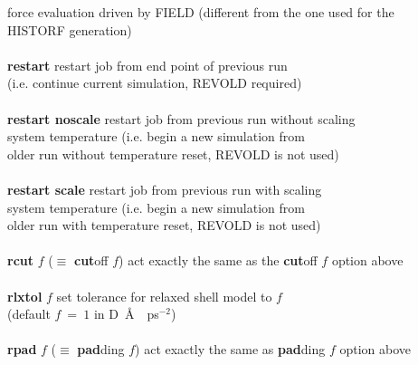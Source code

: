 \begin{tabbing}
\>                                              \> force evaluation driven by FIELD (different from the one used for the \\
\>                                              \> HISTORF generation) \\
\>                                              \> \\
\> {\bf restart}                                \> restart job from end point of previous run \\
\>                                              \> (i.e. continue current simulation, REVOLD required) \\
\>                                              \> \\
\> {\bf restart noscale}                        \> restart job from previous run without scaling \\
\>                                              \> system temperature (i.e. begin a new simulation from \\
\>                                              \> older run without temperature reset, REVOLD is not used) \\
\>                                              \> \\
\> {\bf restart scale}                          \> restart job from previous run with scaling \\
\>                                              \> system temperature (i.e. begin a new simulation from \\
\>                                              \> older run with temperature reset, REVOLD is not used) \\
\>                                              \> \\
\> {\bf rcut} $f$  ($\equiv$ {\bf cut}off $f$)  \> act exactly the same as the {\bf cut}off $f$ option above \\
\>                                              \> \\
\> {\bf rlxtol} $f$                             \> set tolerance for relaxed shell model to $f$ \\
\>                                              \> (default $f~=~1$ in D~\AA~~ps$^{-2}$) \\
\>                                              \> \\
\> {\bf rpad} $f$  ($\equiv$ {\bf pad}ding $f$) \> act exactly the same as {\bf pad}ding $f$ option above \\
\>                                              \> \\

\end{tabbing}
